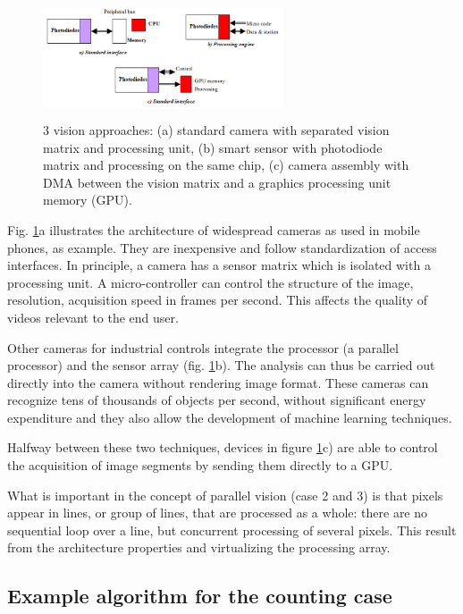 \documentclass[10pt,a4paper]{article}
\begin{document}
\begin{figure}[ht]
\centering
\includegraphics[width=2.8in,height=1.4in]{img/Camera.png}
\caption{3 vision approaches: (a) standard camera with separated vision matrix and processing unit, (b) smart sensor with photodiode matrix and processing on the same chip, (c) camera assembly with DMA between the vision matrix and a graphics processing unit memory (GPU).}
\label{img:Camera}
\end{figure}

Fig. \ref{img:Camera}a  illustrates the architecture of widespread cameras as used in mobile phones, as example. 
They are inexpensive and follow standardization of access interfaces. In principle, a camera has a sensor matrix which is isolated with a processing unit. A micro-controller can control the structure of the image, resolution, acquisition speed in frames per second. This affects the quality of videos relevant to the end user.

Other cameras for industrial controls integrate the processor (a parallel processor) and the sensor array (fig. \ref{img:Camera}b). The analysis can thus be carried out directly into the camera without rendering image format. These cameras can recognize tens of thousands of objects per second, without significant energy expenditure and they also allow the development of machine learning techniques.

Halfway between these two techniques, devices in figure \ref{img:Camera}c) are able to control the acquisition of image segments by sending them directly to a GPU.

What is important in the concept of parallel vision (case 2 and 3) is that
pixels appear in lines, or group of lines,  that are processed as a whole: 
there are no sequential loop over a line, but concurrent processing of several pixels.
This result from the architecture properties and virtualizing the 
processing array.

\subsection {Example algorithm for the counting case}
\end{document}
